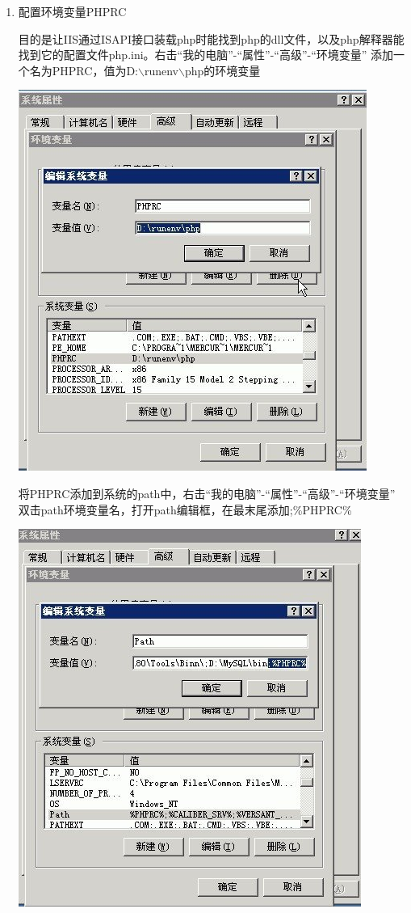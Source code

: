 \documentclass{article}
\begin{document}
\begin{enumerate}
\item 配置环境变量PHPRC

目的是让IIS通过ISAPI接口装载php时能找到php的dll文件，以及php解释器能找到它的配置文件php.ini。右击“我的电脑”-“属性”-“高级”-“环境变量” 添加一个名为PHPRC，值为D:$\backslash$runenv$\backslash$php的环境变量

\includegraphics{img/install/windows/apache/1.jpg}

将PHPRC添加到系统的path中，右击“我的电脑”-“属性”-“高级”-“环境变量” 双击path环境变量名，打开path编辑框，在最末尾添加;\%PHPRC\%

\includegraphics{img/install/windows/apache/2.jpg}


\end{enumerate}
\end{document}
